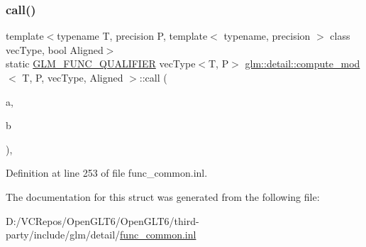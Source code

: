 \subsubsection{\texorpdfstring{call()}{call()}}
{\footnotesize\ttfamily template$<$typename T, precision P, template$<$ typename, precision $>$ class vec\+Type, bool Aligned$>$ \\
static \mbox{\hyperlink{setup_8hpp_a33fdea6f91c5f834105f7415e2a64407}{G\+L\+M\+\_\+\+F\+U\+N\+C\+\_\+\+Q\+U\+A\+L\+I\+F\+I\+ER}} vec\+Type$<$T, P$>$ \mbox{\hyperlink{structglm_1_1detail_1_1compute__mod}{glm\+::detail\+::compute\+\_\+mod}}$<$ T, P, vec\+Type, Aligned $>$\+::call (\begin{DoxyParamCaption}\item[{vec\+Type$<$ T, P $>$ const \&}]{a,  }\item[{vec\+Type$<$ T, P $>$ const \&}]{b }\end{DoxyParamCaption})\hspace{0.3cm}{\ttfamily [inline]}, {\ttfamily [static]}}



Definition at line 253 of file func\+\_\+common.\+inl.



The documentation for this struct was generated from the following file\+:\begin{DoxyCompactItemize}
\item 
D\+:/\+V\+C\+Repos/\+Open\+G\+L\+T6/\+Open\+G\+L\+T6/third-\/party/include/glm/detail/\mbox{\hyperlink{func__common_8inl}{func\+\_\+common.\+inl}}\end{DoxyCompactItemize}
